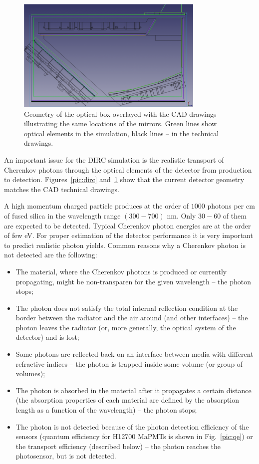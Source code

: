 \documentclass[11pt, a4paper]{article}
\begin{document}
\begin{figure}[!h]
\centering
\includegraphics[width=0.8\textwidth]{pics/obgeom.png}
\caption{\label{pic:obg}
Geometry of the optical box overlayed with the CAD drawings illustrating the same locations of the mirrors. Green lines show optical elements in the simulation, black lines -- in the technical drawings.
}
\end{figure}

An important issue for the DIRC simulation is the realistic transport of Cherenkov photons through the optical elements of the detector from production to detection. Figures~\ref{pic:dirc} and~\ref{pic:obg} show that the current detector geometry matches the CAD technical drawings.

A high momentum charged particle produces at the order of $1000$ photons per cm of fused silica in the wavelength range $(300-700)$ nm. Only $30-60$ of them are expected to be detected. Typical Cherenkov photon energies are at the order of few eV. For proper estimation of the detector performance it is very important to predict realistic photon yields. Common reasons why a Cherenkov photon is not detected are the following:

\begin{itemize}
\item The material, where the Cherenkov photons is produced or currently propagating, might be non-transparen for the given wavelength -- the photon stops;
\item The photon does not satisfy the total internal reflection condition at the border between the radiator and the air around (and other interfaces) -- the photon leaves the radiator (or, more generally, the optical system of the detector) and is lost;
\item Some photons are reflected back on an interface between media with different refractive indices -- the photon is trapped inside some volume (or group of volumes);
\item The photon is absorbed in the material after it propagates a certain distance (the absorption properties of each material are defined by the absorption length as a function of the wavelength) -- the photon stops;
\item The photon is not detected because of the photon detection efficiency of the sensors (quantum efficiency for H12700 MaPMTs is shown in Fig.~\ref{pic:qe}) or the transport efficiency (described below)  -- the photon reaches the photosensor, but is not detected.
\end{itemize}
\end{document}
